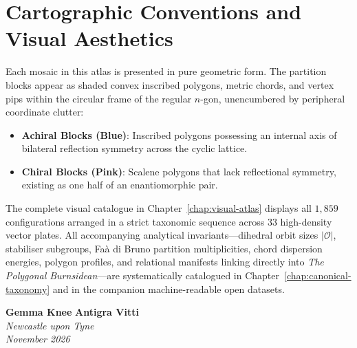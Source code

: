 \section*{Cartographic Conventions and Visual Aesthetics}

Each mosaic in this atlas is presented in pure geometric form. The partition blocks appear as shaded convex inscribed polygons, metric chords, and vertex pips within the circular frame of the regular $n$-gon, unencumbered by peripheral coordinate clutter:
\begin{itemize}
    \item \textbf{Achiral Blocks (Blue)}: Inscribed polygons possessing an internal axis of bilateral reflection symmetry across the cyclic lattice.
    \item \textbf{Chiral Blocks (Pink)}: Scalene polygons that lack reflectional symmetry, existing as one half of an enantiomorphic pair.
\end{itemize}

The complete visual catalogue in Chapter~\ref{chap:visual-atlas} displays all $1{,}859$ configurations arranged in a strict taxonomic sequence across 33 high-density vector plates. All accompanying analytical invariants---dihedral orbit sizes $|\mathcal{O}|$, stabiliser subgroups, Fa\`a di Bruno partition multiplicities, chord dispersion energies, polygon profiles, and relational manifests linking directly into \emph{The Polygonal Burnsidean}---are systematically catalogued in Chapter~\ref{chap:canonical-taxonomy} and in the companion machine-readable open datasets.

\bigskip
\begin{flushright}
\textbf{Gemma Knee} \qquad \textbf{Antigra Vitti} \\
\emph{Newcastle upon Tyne} \\
\emph{November 2026}
\end{flushright}
